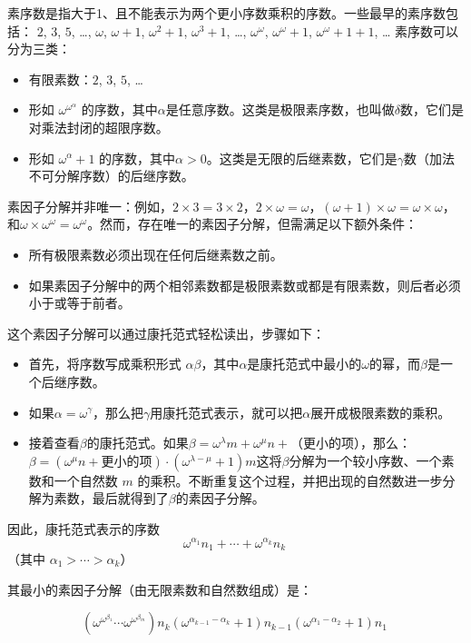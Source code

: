 素序数是指大于1、且不能表示为两个更小序数乘积的序数。一些最早的素序数包括：  
\(2\), \(3\), \(5\), …, \(\omega\), \(\omega + 1\), \(\omega^2 + 1\), \(\omega^3 + 1\), …, \(\omega^\omega\), \(\omega^\omega + 1\), \(\omega^\omega + 1 + 1\), … 素序数可以分为三类：
\begin{itemize}
\item 有限素数：\(2\), \(3\), \(5\), …  
\item 形如 \(\omega^{\omega^\alpha}\) 的序数，其中\(\alpha\)是任意序数。这类是极限素序数，也叫做\(\delta\)数，它们是对乘法封闭的超限序数。  
\item 形如 \(\omega^\alpha + 1\) 的序数，其中\(\alpha > 0\)。这类是无限的后继素数，它们是\(\gamma\)数（加法不可分解序数）的后继序数。
\end{itemize}
素因子分解并非唯一：例如，\(2 \times 3 = 3 \times 2\)，\(2 \times \omega = \omega\)，\((\omega + 1) \times \omega = \omega \times \omega\)，和\(\omega \times \omega^\omega = \omega^\omega\)。然而，存在唯一的素因子分解，但需满足以下额外条件：  
\begin{itemize}
\item 所有极限素数必须出现在任何后继素数之前。  
\item 如果素因子分解中的两个相邻素数都是极限素数或都是有限素数，则后者必须小于或等于前者。
\end{itemize}
这个素因子分解可以通过康托范式轻松读出，步骤如下：
\begin{itemize}
\item 首先，将序数写成乘积形式 \(\alpha \beta\)，其中\(\alpha\)是康托范式中最小的\(\omega\)的幂，而\(\beta\)是一个后继序数。
\item 如果\(\alpha = \omega^\gamma\)，那么把\(\gamma\)用康托范式表示，就可以把\(\alpha\)展开成极限素数的乘积。
\item 接着查看\(\beta\)的康托范式。如果\(\beta = \omega^\lambda m + \omega^\mu n +\)（更小的项），那么：\(\beta = (\omega^\mu n + \text{更小的项}) \cdot (\omega^{\lambda - \mu} + 1)m\)这将\(\beta\)分解为一个较小序数、一个素数和一个自然数 \(m\) 的乘积。不断重复这个过程，并把出现的自然数进一步分解为素数，最后就得到了\(\beta\)的素因子分解。
\end{itemize}
因此，康托范式表示的序数  
\[
\omega^{\alpha_1}n_1 + \cdots + \omega^{\alpha_k}n_k~
\]
（其中 \(\alpha_1 > \cdots > \alpha_k\)）  

其最小的素因子分解（由无限素数和自然数组成）是：  

\[
\left(\omega^{\omega^{\beta_1}} \cdots \omega^{\omega^{\beta_m}}\right)n_k(\omega^{\alpha_{k-1} - \alpha_k} + 1)n_{k-1}(\omega^{\alpha_1 - \alpha_2} + 1)n_1~
\]

